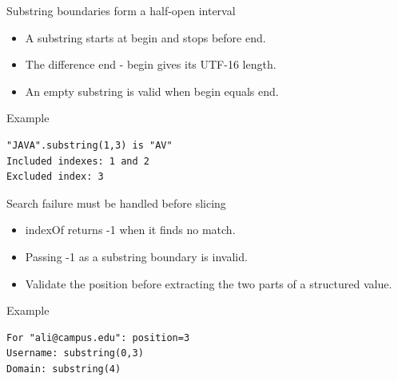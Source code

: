 \documentclass[10pt,aspectratio=169]{beamer}
\begin{document}
\begin{frame}[fragile,t]{Substring boundaries form a half-open interval}
\begin{itemize}
\item A substring starts at begin and stops before end.
\item The difference end - begin gives its UTF-16 length.
\item An empty substring is valid when begin equals end.
\end{itemize}
\vspace{1mm}\begin{block}{Example}
\begin{lstlisting}
"JAVA".substring(1,3) is "AV"
Included indexes: 1 and 2
Excluded index: 3
\end{lstlisting}
\end{block}
\end{frame}

\begin{frame}[fragile,t]{Search failure must be handled before slicing}
\begin{itemize}
\item indexOf returns -1 when it finds no match.
\item Passing -1 as a substring boundary is invalid.
\item Validate the position before extracting the two parts of a structured value.
\end{itemize}
\vspace{1mm}\begin{block}{Example}
\begin{lstlisting}
For "ali@campus.edu": position=3
Username: substring(0,3)
Domain: substring(4)
\end{lstlisting}
\end{block}
\end{frame}
\end{document}
